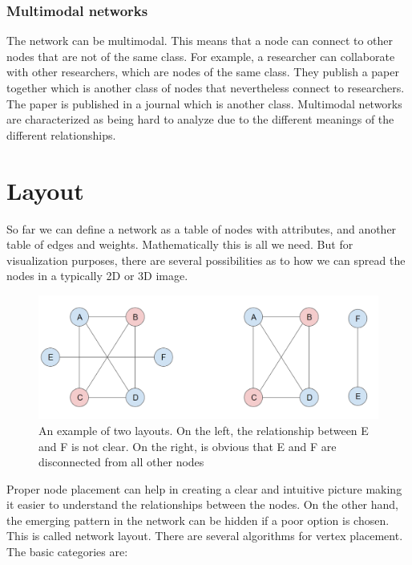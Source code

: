 
\subsubsection{Multimodal networks}

The network can be multimodal. This means that a node can connect to other nodes that are not of the same class. For example, a researcher can collaborate with other researchers, which are nodes of the same class. They publish a paper together which is another class of nodes that nevertheless connect to researchers. The paper is published in a journal which is another class. Multimodal networks are characterized as being hard to analyze due to the different meanings of the different relationships.

\section{Layout}

So far we can define a network as a table of nodes with attributes, and another table of edges and weights. Mathematically this is all we need. But for visualization purposes, there are several possibilities as to how we can spread the nodes in a typically 2D or 3D image.

    \begin{figure}[H]
        \centering
            \includegraphics[width=0.7\linewidth]{figures/Networks/Layouts/isomorp.png} 
        \caption{An example of two layouts. On the left, the relationship between E and F is not clear. On the right, is obvious that E and F are disconnected from all other nodes}
        \label{figure:networkExampleLayout}
    \end{figure}


Proper node placement can help in creating a clear and intuitive picture making it easier to understand the relationships between the nodes. On the other hand, the emerging pattern in the network can be hidden if a poor option is chosen. This is called network layout. There are several algorithms for vertex placement. The basic categories are:



